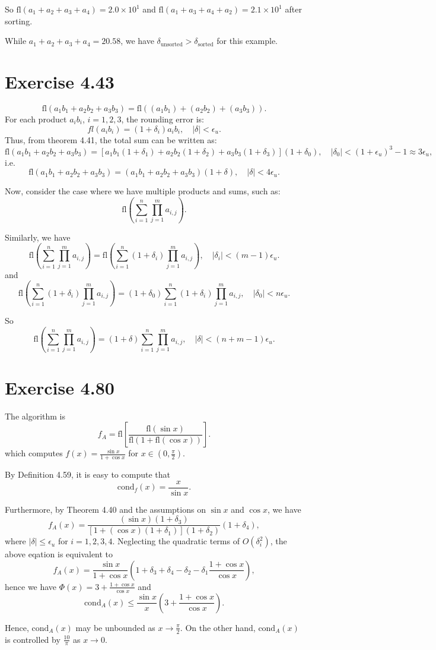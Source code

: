 \documentclass[a4paper]{article}
\begin{document}
So $\text{fl}(a_1+a_2+a_3+a_4)=2.0\times 10^1$ and $\text{fl}(a_1+a_3+a_4+a_2)=2.1\times 10^1$ after sorting.

While $a_1+a_2+a_3+a_4=20.58$, we have $\delta_{\text{unsorted}}> \delta_{\text{sorted}}$ for this example.


\section*{Exercise 4.43}
\[
\text{fl}(a_1b_1 + a_2b_2 + a_3b_3) = \text{fl}\left( (a_1b_1) + (a_2b_2) + (a_3b_3) \right).
\]
For each product \( a_ib_i \), $i=1,2,3$, the rounding error is:
\[
fl(a_ib_i)=(1+\delta_i)a_i b_i, \quad |\delta|<\epsilon_u.
\]
Thus, from theorem 4.41, the total sum can be written as:
\[
\text{fl}(a_1b_1 + a_2b_2 + a_3b_3) = [a_1b_1(1+\delta_1) + a_2b_2(1+\delta_2) + a_3b_3(1+\delta_3)](1+\delta_0), \quad |\delta_0|<(1+\epsilon_u)^3-1\approx 3 \epsilon_u,
\]
i.e. 
$$
\text{fl}(a_1b_1 + a_2b_2 + a_3b_3)=(a_1b_1 + a_2b_2 + a_3b_3)(1+\delta), \quad |\delta|< 4\epsilon_u.
$$

Now, consider the case where we have multiple products and sums, such as:
\[
\text{fl}\left( \sum_{i=1}^{n} \prod_{j=1}^{m} a_{i,j} \right).
\]

Similarly, we have
$$
\text{fl}\left( \sum_{i=1}^{n} \prod_{j=1}^{m} a_{i,j} \right)=\text{fl}\left( \sum_{i=1}^{n}(1+\delta_i) \prod_{j=1}^{m} a_{i,j} \right), \quad |\delta_i|<(m-1)\epsilon_u.
$$
and
$$
\text{fl}\left( \sum_{i=1}^{n}(1+\delta_i) \prod_{j=1}^{m} a_{i,j} \right)=(1+\delta_0)\sum_{i=1}^{n} (1+\delta_i)\prod_{j=1}^{m} a_{i,j}, \quad |\delta_0|<n\epsilon_u.
$$

So 
$$
\text{fl}\left( \sum_{i=1}^{n} \prod_{j=1}^{m} a_{i,j} \right)=(1+\delta)\sum_{i=1}^{n} \prod_{j=1}^{m} a_{i,j}, \quad |\delta|<(n+m-1)\epsilon_u.
$$

\section*{Exercise 4.80}
The algorithm is 
$$
f_A=\text{fl}\left[\dfrac{\text{fl}(\sin x)}{\text{fl}(1+\text{fl}(\cos x))}\right].
$$
which computes $f(x)=\frac{\sin x}{1+\cos x}$ for $x\in(0,\frac{\pi}{2})$.

By Definition 4.59, it is easy to compute that 
$$
\text{cond}_f(x)=\frac{x}{\sin x}.
$$

Furthermore, by Theorem 4.40 and the assumptions on $\sin x$ and $\cos x$, we have
$$
f_A(x)=\frac{(\sin x)(1+\delta_3)}{[1+(\cos x)(1+\delta_1)](1+\delta_2)}(1+\delta_4),
$$
where $|\delta| \leq \epsilon_u$ for $i=1,2,3,4$. Neglecting the quadratic terms of $O(\delta ^2_i)$, the above eqation is equivalent to 
$$
f_A(x)=\frac{\sin x}{1+\cos x}(1+\delta_3+\delta_4-\delta_2-\delta_1\frac{1+\cos x}{\cos x}),
$$
hence we have $\Phi(x)=3+\frac{1+\cos x}{\cos x}$ and 
$$
\text{cond}_A(x)\leq \frac{\sin x}{x}(3+\frac{1+\cos x}{\cos x}).
$$

Hence, $\text{cond}_A(x)$ may be unbounded as $x\rightarrow \frac{\pi}{2}$. On the other hand, $\text{cond}_A(x)$ is controlled by $\frac{10}{\pi}$ as $x\rightarrow 0$.
\end{document}
